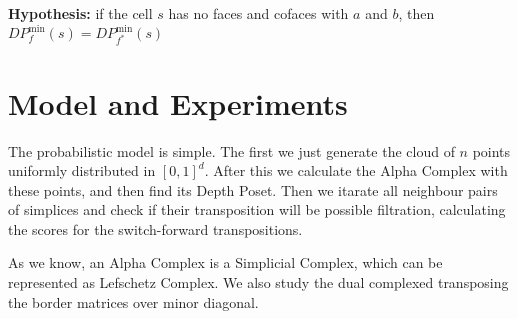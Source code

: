 \documentclass{article}
\begin{document}
\par \textbf{Hypothesis:} if the cell $s$ has no faces and cofaces with $a$ and $b$, then $DP_f^\text{min}(s) = DP_{f^*}^\text{min}(s)$


\section{Model and Experiments}

\par The probabilistic model is simple. The first we just generate the cloud of $n$ points uniformly distributed in $[0, 1]^d$. After this we calculate the Alpha Complex with these points, and then find its Depth Poset. Then we itarate all neighbour pairs of simplices and check if their transposition will be possible filtration, calculating the scores for the switch-forward transpositions.
\par As we know, an Alpha Complex is a Simplicial Complex, which can be represented as Lefschetz Complex. We also study the dual complexed transposing the border matrices over minor diagonal.
\end{document}

